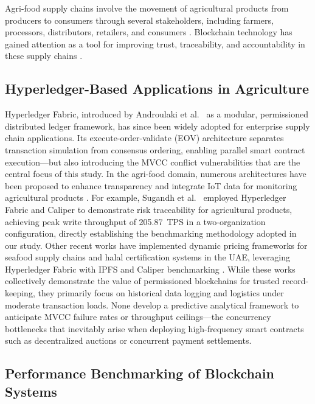 \documentclass[manuscript,screen,nofonts]{acmart}
\begin{document}
Agri-food supply chains involve the movement of agricultural products from producers to consumers through several stakeholders, including farmers, processors, distributors, retailers, and consumers \citep{weerabahu_challenges_2022,nayal_antecedents_2021}. Blockchain technology has gained attention as a tool for improving trust, traceability, and accountability in these supply chains \citep{zhao_blockchain_2019,shahid_blockchain-based_2020}.

\subsection{Hyperledger-Based Applications in Agriculture}

Hyperledger Fabric, introduced by Androulaki et al.~\citep{androulaki_hyperledger_2018} as a modular, permissioned distributed ledger framework, has since been widely adopted for enterprise supply chain applications. Its execute-order-validate (EOV) architecture separates transaction simulation from consensus ordering, enabling parallel smart contract execution---but also introducing the MVCC conflict vulnerabilities that are the central focus of this study. In the agri-food domain, numerous architectures have been proposed to enhance transparency and integrate IoT data for monitoring agricultural products \citep{marchese_blockchain-based_2022,zhang_information_2022,iftekhar_blockchain-based_2021,joo_evidence_2021}. For example, Sugandh et al.~\citep{sugandh_approach_2023} employed Hyperledger Fabric and Caliper to demonstrate risk traceability for agricultural products, achieving peak write throughput of 205.87~TPS in a two-organization configuration, directly establishing the benchmarking methodology adopted in our study. Other recent works have implemented dynamic pricing frameworks for seafood supply chains and halal certification systems in the UAE, leveraging Hyperledger Fabric with IPFS and Caliper benchmarking \citep{rani_stp_2025,talib_blockchain-enabled_2026,keo_secure_2025}. While these works collectively demonstrate the value of permissioned blockchains for trusted record-keeping, they primarily focus on historical data logging and logistics under moderate transaction loads. None develop a predictive analytical framework to anticipate MVCC failure rates or throughput ceilings---the concurrency bottlenecks that inevitably arise when deploying high-frequency smart contracts such as decentralized auctions or concurrent payment settlements.

\subsection{Performance Benchmarking of Blockchain Systems}
\end{document}
